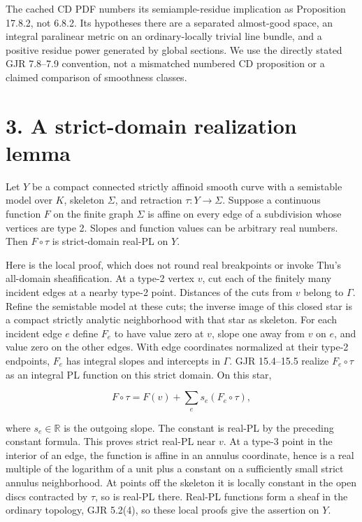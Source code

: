 \documentclass[11pt]{article}
\begin{document}
The cached CD PDF numbers its semiample-residue implication as Proposition 17.8.2, not 6.8.2. Its hypotheses there are a separated almost-good space, an integral paralinear metric on an ordinary-locally trivial line bundle, and a positive residue power generated by global sections. We use the directly stated GJR 7.8--7.9 convention, not a mismatched numbered CD proposition or a claimed comparison of smoothness classes.

\section*{3. A strict-domain realization lemma}

Let $Y$ be a compact connected strictly affinoid smooth curve with a semistable model over $K$, skeleton $\Sigma$, and retraction $\tau:Y\to\Sigma$. Suppose a continuous function $F$ on the finite graph $\Sigma$ is affine on every edge of a subdivision whose vertices are type 2. Slopes and function values can be arbitrary real numbers. Then $F\circ\tau$ is strict-domain real-PL on $Y$.

Here is the local proof, which does not round real breakpoints or invoke Thu's all-domain sheafification. At a type-2 vertex $v$, cut each of the finitely many incident edges at a nearby type-2 point. Distances of the cuts from $v$ belong to $\Gamma$. Refine the semistable model at these cuts; the inverse image of this closed star is a compact strictly analytic neighborhood with that star as skeleton. For each incident edge $e$ define $F_e$ to have value zero at $v$, slope one away from $v$ on $e$, and value zero on the other edges. With edge coordinates normalized at their type-2 endpoints, $F_e$ has integral slopes and intercepts in $\Gamma$. GJR 15.4--15.5 realize $F_e\circ\tau$ as an integral PL function on this strict domain. On this star,

\[F\circ\tau=F(v)+\sum_e s_e(F_e\circ\tau),\]

where $s_e\in\mathbb R$ is the outgoing slope. The constant is real-PL by the preceding constant formula. This proves strict real-PL near $v$. At a type-3 point in the interior of an edge, the function is affine in an annulus coordinate, hence is a real multiple of the logarithm of a unit plus a constant on a sufficiently small strict annulus neighborhood. At points off the skeleton it is locally constant in the open discs contracted by $\tau$, so is real-PL there. Real-PL functions form a sheaf in the ordinary topology, GJR 5.2(4), so these local proofs give the assertion on $Y$.
\end{document}
